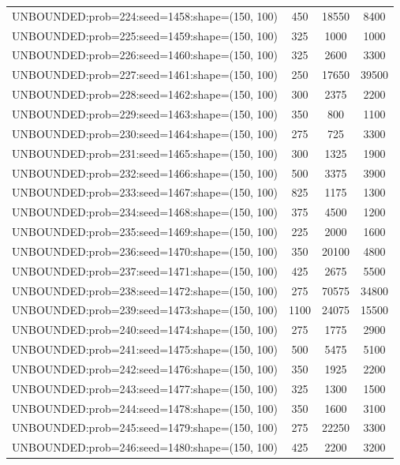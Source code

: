 \begin{longtable}{lccc}
UNBOUNDED:prob=224:seed=1458:shape=(150, 100) &      450 & 18550 &   8400 \\
UNBOUNDED:prob=225:seed=1459:shape=(150, 100) &      325 &  1000 &   1000 \\
UNBOUNDED:prob=226:seed=1460:shape=(150, 100) &      325 &  2600 &   3300 \\
UNBOUNDED:prob=227:seed=1461:shape=(150, 100) &      250 & 17650 &  39500 \\
UNBOUNDED:prob=228:seed=1462:shape=(150, 100) &      300 &  2375 &   2200 \\
UNBOUNDED:prob=229:seed=1463:shape=(150, 100) &      350 &   800 &   1100 \\
UNBOUNDED:prob=230:seed=1464:shape=(150, 100) &      275 &   725 &   3300 \\
UNBOUNDED:prob=231:seed=1465:shape=(150, 100) &      300 &  1325 &   1900 \\
UNBOUNDED:prob=232:seed=1466:shape=(150, 100) &      500 &  3375 &   3900 \\
UNBOUNDED:prob=233:seed=1467:shape=(150, 100) &      825 &  1175 &   1300 \\
UNBOUNDED:prob=234:seed=1468:shape=(150, 100) &      375 &  4500 &   1200 \\
UNBOUNDED:prob=235:seed=1469:shape=(150, 100) &      225 &  2000 &   1600 \\
UNBOUNDED:prob=236:seed=1470:shape=(150, 100) &      350 & 20100 &   4800 \\
UNBOUNDED:prob=237:seed=1471:shape=(150, 100) &      425 &  2675 &   5500 \\
UNBOUNDED:prob=238:seed=1472:shape=(150, 100) &      275 & 70575 &  34800 \\
UNBOUNDED:prob=239:seed=1473:shape=(150, 100) &     1100 & 24075 &  15500 \\
UNBOUNDED:prob=240:seed=1474:shape=(150, 100) &      275 &  1775 &   2900 \\
UNBOUNDED:prob=241:seed=1475:shape=(150, 100) &      500 &  5475 &   5100 \\
UNBOUNDED:prob=242:seed=1476:shape=(150, 100) &      350 &  1925 &   2200 \\
UNBOUNDED:prob=243:seed=1477:shape=(150, 100) &      325 &  1300 &   1500 \\
UNBOUNDED:prob=244:seed=1478:shape=(150, 100) &      350 &  1600 &   3100 \\
UNBOUNDED:prob=245:seed=1479:shape=(150, 100) &      275 & 22250 &   3300 \\
UNBOUNDED:prob=246:seed=1480:shape=(150, 100) &      425 &  2200 &   3200 \\

\end{longtable}
